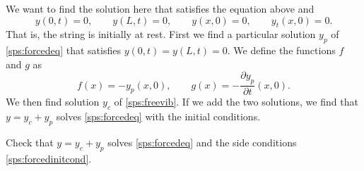 \documentclass{ximera}
\begin{document}
We want to find the solution here that satisfies the equation above and
\begin{equation} \label{sps:forcedinitcond}
    y(0,t) = 0, \qquad y(L,t) = 0, \qquad
    y(x,0) = 0, \qquad y_t(x,0) = 0.
\end{equation}
That is, the string is initially at rest.  First we find a particular solution $y_p$ of \eqref{sps:forcedeq} that satisfies $y(0,t) = y(L,t) = 0$.  We define the functions $f$ and $g$ as
\begin{equation*}
    f(x) = -y_p(x,0), \qquad g(x) = -\frac{\partial y_p}{\partial t} (x,0) .
\end{equation*}
We then find solution $y_c$ of \eqref{sps:freevib}.  If we add the two solutions, we find that $y = y_c + y_p$ solves \eqref{sps:forcedeq} with the initial conditions.

\begin{exercise}
    Check that $y = y_c + y_p$ solves \eqref{sps:forcedeq} and the side conditions \eqref{sps:forcedinitcond}.
\end{exercise}
\end{document}
